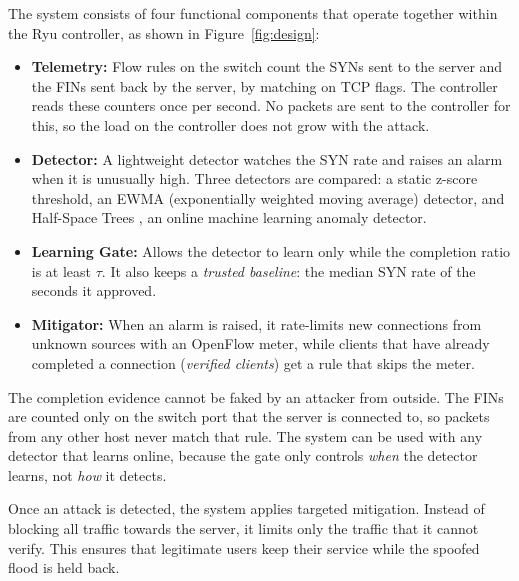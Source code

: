 \documentclass[12pt,a4paper]{article}
\begin{document}
The system consists of four functional components that operate together within
the Ryu controller, as shown in Figure~\ref{fig:design}:
\begin{itemize}
  \item \textbf{Telemetry:} Flow rules on the switch count the SYNs sent to the
  server and the FINs sent back by the server, by matching on TCP flags. The
  controller reads these counters once per second. No packets are sent to the
  controller for this, so the load on the controller does not grow with the
  attack.
  \item \textbf{Detector:} A lightweight detector watches the SYN rate and
  raises an alarm when it is unusually high. Three detectors are compared:
  a static z-score threshold, an EWMA (exponentially weighted moving average)
  detector, and Half-Space Trees \cite{tan2011}, an online machine learning
  anomaly detector.
  \item \textbf{Learning Gate:} Allows the detector to learn only while the
  completion ratio is at least $\tau$. It also keeps a \emph{trusted baseline}:
  the median SYN rate of the seconds it approved.
  \item \textbf{Mitigator:} When an alarm is raised, it rate-limits new
  connections from unknown sources with an OpenFlow meter, while clients that
  have already completed a connection (\emph{verified clients}) get a rule that
  skips the meter.
\end{itemize}

The completion evidence cannot be faked by an attacker from outside. The FINs
are counted only on the switch port that the server is connected to, so packets
from any other host never match that rule. The system can be used with any
detector that learns online, because the gate only controls \emph{when} the
detector learns, not \emph{how} it detects.

Once an attack is detected, the system applies targeted mitigation. Instead of
blocking all traffic towards the server, it limits only the traffic that it
cannot verify. This ensures that legitimate users keep their service while the
spoofed flood is held back.
\end{document}
